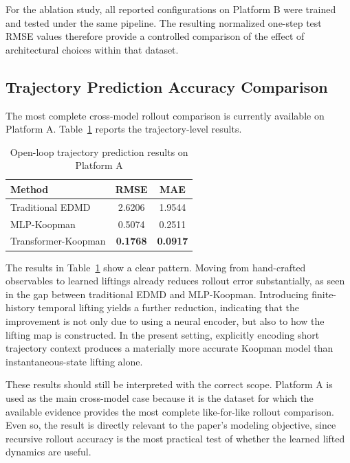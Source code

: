 \documentclass[journal]{IEEEtran}
\begin{document}
For the ablation study, all reported configurations on Platform B were trained and tested under the same pipeline. The resulting normalized one-step test RMSE values therefore provide a controlled comparison of the effect of architectural choices within that dataset.

\subsection{Trajectory Prediction Accuracy Comparison}

The most complete cross-model rollout comparison is currently available on Platform A. Table~\ref{tab:prediction_platform_a} reports the trajectory-level results.

\begin{table}[!t]
\renewcommand{\arraystretch}{1.2}
\caption{Open-loop trajectory prediction results on Platform A}
\label{tab:prediction_platform_a}
\centering
\begin{tabular}{lcc}
\hline\hline
Method & RMSE & MAE \\
\hline
Traditional EDMD & 2.6206 & 1.9544 \\
MLP-Koopman & 0.5074 & 0.2511 \\
Transformer-Koopman & \textbf{0.1768} & \textbf{0.0917} \\
\hline\hline
\end{tabular}
\end{table}

The results in Table~\ref{tab:prediction_platform_a} show a clear pattern. Moving from hand-crafted observables to learned liftings already reduces rollout error substantially, as seen in the gap between traditional EDMD and MLP-Koopman. Introducing finite-history temporal lifting yields a further reduction, indicating that the improvement is not only due to using a neural encoder, but also to how the lifting map is constructed. In the present setting, explicitly encoding short trajectory context produces a materially more accurate Koopman model than instantaneous-state lifting alone.

These results should still be interpreted with the correct scope. Platform A is used as the main cross-model case because it is the dataset for which the available evidence provides the most complete like-for-like rollout comparison. Even so, the result is directly relevant to the paper's modeling objective, since recursive rollout accuracy is the most practical test of whether the learned lifted dynamics are useful.
\end{document}
